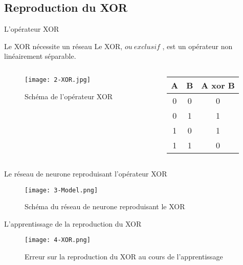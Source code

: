 \subsection{Reproduction du XOR}

\begin{frame}{L'opérateur XOR}
	\begin{block}{Le XOR nécessite un réseau}
		Le XOR, \og $ou\ exclusif$ \fg, est un opérateur non linéairement séparable. \\
	\end{block}
    \begin{columns}
        \begin{column}{0.6\textwidth}
            \begin{figure}
                \centering
                \texttt{[image: 2-XOR.jpg]}
                \caption{Schéma de l'opérateur XOR}
            \end{figure}
        \end{column}
        \begin{column}[]{0.3\textwidth}
            \begin{center}
                \begin{tabular}{|c c | c|}
                    \hline
                    A & B & A xor B \\ \hline
                    0 & 0 & 0 \\
                    0 & 1 & 1 \\
                    1 & 0 & 1 \\
                    1 & 1 & 0 \\
                    \hline
                \end{tabular}
                \end{center}
        \end{column}
    \end{columns}
\end{frame}



\begin{frame}{Le réseau de neurone reproduisant l'opérateur XOR}
	\begin{figure}
		\centering
		\texttt{[image: 3-Model.png]}
		\caption{Schéma du réseau de neurone reproduisant le XOR}
	\end{figure}
\end{frame}

\begin{frame}{L'apprentissage de la reproduction du XOR}
	\begin{figure}
		\centering
		\texttt{[image: 4-XOR.png]}
		\caption{Erreur sur la reproduction du XOR au cours de l'apprentissage}
	\end{figure}
\end{frame}


